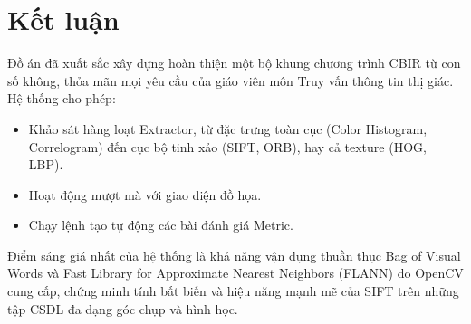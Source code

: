 \chapter{Kết luận}

Đồ án đã xuất sắc xây dựng hoàn thiện một bộ khung chương trình CBIR từ con số không, thỏa mãn mọi yêu cầu của giáo viên môn Truy vấn thông tin thị giác. Hệ thống cho phép:
\begin{itemize}
    \item Khảo sát hàng loạt Extractor, từ đặc trưng toàn cục (Color Histogram, Correlogram) đến cục bộ tinh xảo (SIFT, ORB), hay cả texture (HOG, LBP).
    \item Hoạt động mượt mà với giao diện đồ họa.
    \item Chạy lệnh tạo tự động các bài đánh giá Metric.
\end{itemize}
Điểm sáng giá nhất của hệ thống là khả năng vận dụng thuần thục Bag of Visual Words và Fast Library for Approximate Nearest Neighbors (FLANN) do OpenCV cung cấp, chứng minh tính bất biến và hiệu năng mạnh mẽ của SIFT trên những tập CSDL đa dạng góc chụp và hình học.
